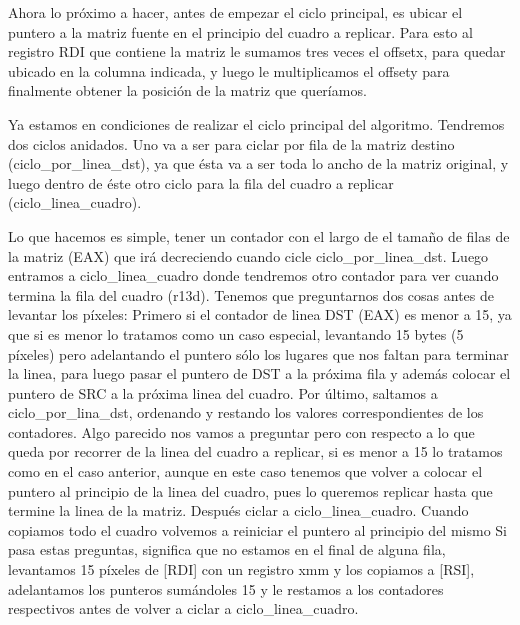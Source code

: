 Ahora lo próximo a hacer, antes de empezar el ciclo principal, es ubicar el puntero a la matriz fuente en el principio
del cuadro a replicar. \newline
Para esto al registro RDI que contiene la matriz le sumamos tres veces el offsetx, 
para quedar ubicado en la columna indicada, y luego le multiplicamos el offsety para finalmente obtener 
la posición de la matriz que queríamos. \newline

Ya estamos en condiciones de realizar el ciclo principal del algoritmo. Tendremos dos ciclos anidados. 
Uno va a ser para ciclar por fila de la matriz destino (ciclo\_por\_linea\_dst), 
ya que ésta va a ser toda lo ancho de la matriz original, y luego dentro de éste otro ciclo para la fila del 
cuadro a replicar (ciclo\_linea\_cuadro). \newline

Lo que hacemos es simple, tener un contador con el largo de el tamaño de filas de la matriz (EAX) que irá 
decreciendo cuando cicle ciclo\_por\_linea\_dst. Luego entramos a ciclo\_linea\_cuadro donde tendremos otro contador \newline
para ver cuando termina la fila del cuadro (r13d). Tenemos que preguntarnos dos cosas antes de levantar los píxeles: 
Primero si el contador de linea DST (EAX) es menor a 15, ya que si es menor lo tratamos como un caso especial, levantando 15 
bytes (5 píxeles) pero adelantando el puntero sólo los lugares que nos faltan para terminar la linea,
para luego pasar el puntero de DST a la próxima fila y además colocar el puntero de SRC a la próxima linea del cuadro. \newline
Por último, saltamos a ciclo\_por\_lina\_dst, ordenando y restando los valores correspondientes de los contadores. \newline
Algo parecido nos vamos a preguntar pero con respecto a lo que queda por recorrer de la linea del cuadro a replicar, \newline
si es menor a 15 lo tratamos como en el caso anterior, aunque en este caso tenemos que volver a colocar el \newline
puntero al principio de la linea del cuadro, pues lo queremos replicar hasta que termine la linea de la matriz. \newline
Después ciclar a ciclo\_linea\_cuadro. Cuando copiamos todo el cuadro volvemos a reiniciar el puntero al principio del mismo 
Si pasa estas preguntas, significa que no estamos en el final de alguna fila, 
levantamos 15 píxeles de [RDI] con un registro xmm y los copiamos a [RSI], 
adelantamos los punteros sumándoles 15 y le restamos a los contadores respectivos antes de volver a 
ciclar a ciclo\_linea\_cuadro. \newline
 
